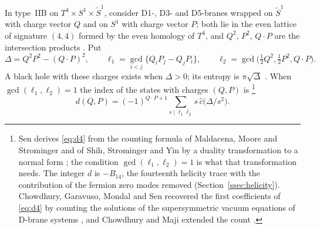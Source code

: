 \documentclass[11pt]{amsart}
\theoremstyle{definition}
\newcommand{\cc}{\hat c}
\begin{document}
In type~IIB on $T^4\times S^1\times\widetilde S^1$, consider D1-, D3- and D5-branes wrapped on $\widetilde S^1$ with charge vector $Q$ and on $S^1$ with charge vector $P$; both lie in the even lattice of signature $(4,4)$ formed by the even homology of $T^4$, and $Q^2$, $P^2$, $Q\cdot P$ are the intersection products \cite{Sen10}. Put
\[
\Delta=Q^2P^2-(Q\cdot P)^2,\qquad \ell_1=\gcd_{i<j}\{Q_iP_j-Q_jP_i\},\qquad \ell_2=\gcd\bigl(\tfrac12Q^2,\tfrac12P^2,Q\cdot P\bigr).
\]
A black hole with these charges exists when $\Delta>0$; its entropy is $\pi\sqrt\Delta$ \cite{KK96}. When $\gcd(\ell_1,\ell_2)=1$ the index of the states with charges $(Q,P)$ is \cite[(2.4)]{Sen10}\footnote{Sen derives \eqref{eq:d4} from the counting formula of Maldacena, Moore and Strominger \cite{MMS99} and of Shih, Strominger and Yin \cite{SSY06} by a duality transformation to a normal form \cite[\S2, App.~A]{Sen10}; the condition $\gcd(\ell_1,\ell_2)=1$ is what that transformation needs. The integer $d$ is $-B_{14}$, the fourteenth helicity trace with the contribution of the fermion zero modes removed (Section~\ref{ssec:helicity}). Chowdhury, Garavuso, Mondal and Sen recovered the first coefficients of \eqref{eq:d4} by counting the solutions of the supersymmetric vacuum equations of D-brane systems \cite{CGMS14}, and Chowdhury and Maji extended the count \cite{CM24}.}
\begin{equation}\label{eq:d4}
d(Q,P)=(-1)^{Q\cdot P+1}\sum_{s\mid \ell_1\ell_2}s\,\cc\bigl(\Delta/s^2\bigr).
\end{equation}
\end{document}
